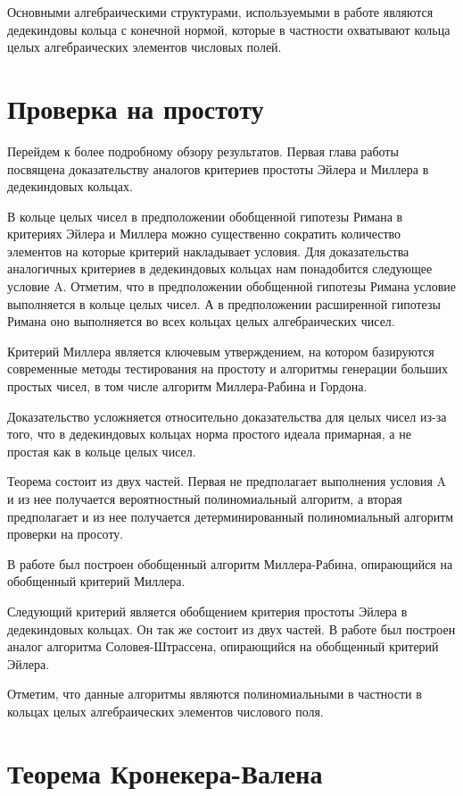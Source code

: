 \documentclass[12pt]{article}
\begin{document}
Основными алгебраическими структурами, используемыми в работе являются дедекиндовы кольца с конечной нормой, которые в частности охватывают кольца целых алгебраических элементов числовых полей.

\section{Проверка на простоту}

Перейдем к более подробному обзору результатов.
Первая глава работы посвящена доказательству аналогов критериев простоты Эйлера и Миллера в дедекиндовых кольцах.

В кольце целых чисел в предположении обобщенной гипотезы Римана в критериях Эйлера и Миллера можно существенно сократить количество элементов на которые критерий накладывает условия.
Для доказательства аналогичных критериев в дедекиндовых кольцах нам понадобится следующее условие A.
Отметим, что в предположении обобщенной гипотезы Римана условие выполняется в кольце целых чисел.
А в предположении расширенной гипотезы Римана оно выполняется во всех кольцах целых алгебраических чисел.

Критерий Миллера является ключевым утверждением, на котором базируются современные методы тестирования на простоту и алгоритмы генерации больших простых чисел, в том числе алгоритм Миллера-Рабина и Гордона.

Доказательство усложняется относительно доказательства для целых чисел из-за того, что в дедекиндовых кольцах норма простого идеала примарная, а не простая как в кольце целых чисел.

Теорема состоит из двух частей.
Первая не предполагает выполнения условия A и из нее получается вероятностный полиномиальный алгоритм, а вторая предполагает и из нее получается детерминированный полиномиальный алгоритм проверки на просоту.

В работе был построен обобщенный алгоритм Миллера-Рабина, опирающийся на обобщенный критерий Миллера.

Следующий критерий является обобщением критерия простоты Эйлера в дедекиндовых кольцах.
Он так же состоит из двух частей.
В работе был построен аналог алгоритма Соловея-Штрассена, опирающийся на обобщенный критерий Эйлера.

Отметим, что данные алгоритмы являются полиномиальными в частности в кольцах целых алгебраических элементов числового поля.

\section{Теорема Кронекера-Валена}
\end{document}
